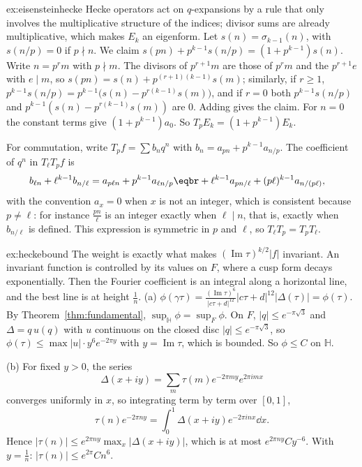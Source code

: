 \begin{solution}{ex:eisensteinhecke}
\idea Hecke operators act on $q$-expansions by a rule that only involves the multiplicative structure of the indices; divisor sums are already multiplicative, which makes $E_k$ an eigenform.
\writeup Let $s(n)=\sigma_{k-1}(n)$, with $s(n/p)=0$ if $p\nmid n$. We claim $s(pn)+p^{k-1}s(n/p)=(1+p^{k-1})s(n)$. Write $n=p^rm$ with $p\nmid m$. The divisors of $p^{r+1}m$ are those of $p^rm$ and the $p^{r+1}e$ with $e\mid m$, so
$s(pn)=s(n)+p^{(r+1)(k-1)}s(m)$; similarly, if $r\ge1$, $p^{k-1}s(n/p)=p^{k-1}\bigl(s(n)-p^{r(k-1)}s(m)\bigr)$, and if $r=0$ both $p^{k-1}s(n/p)$ and $p^{k-1}(s(n)-p^{r(k-1)}s(m))$ are $0$. Adding gives the claim. For $n=0$
the constant terms give $(1+p^{k-1})a_0$. So $T_pE_k=(1+p^{k-1})E_k$.

For commutation, write $T_pf=\sum b_nq^n$ with $b_n=a_{pn}+p^{k-1}a_{n/p}$. The coefficient of $q^n$ in $T_\ell T_pf$ is
\[
\begin{aligned}b_{\ell n}+\ell^{k-1}b_{n/\ell}&=a_{p\ell n}+p^{k-1}a_{\ell n/p}\eqbr+\ell^{k-1}a_{pn/\ell}+(p\ell)^{k-1}a_{n/(p\ell)},\end{aligned}
\]
with the convention $a_x=0$ when $x$ is not an integer, which is consistent because $p\ne\ell$: for instance $\frac{pn}\ell$ is an integer exactly when $\ell\mid n$, that is, exactly when $b_{n/\ell}$ is defined.
This expression is symmetric in $p$ and $\ell$, so $T_\ell T_p=T_pT_\ell$.
\end{solution}

\begin{solution}{ex:heckebound}
\idea The weight is exactly what makes $(\operatorname{Im}\tau)^{k/2}|f|$ invariant. An invariant function is controlled by its values on $F$, where a cusp form decays exponentially. Then the Fourier coefficient is an
integral along a horizontal line, and the best line is at height $\frac1n$.
\writeup (a) $\phi(\gamma\tau)=\frac{(\operatorname{Im}\tau)^6}{|c\tau+d|^{12}}|c\tau+d|^{12}|\Delta(\tau)|=\phi(\tau)$. By Theorem~\ref{thm:fundamental}, $\sup_{\mathbb H}\phi=\sup_F\phi$. On $F$, $|q|\le e^{-\pi\sqrt3}$ and $\Delta=q\,u(q)$ with
$u$ continuous on the closed disc $|q|\le e^{-\pi\sqrt3}$, so $\phi(\tau)\le\max|u|\cdot y^6e^{-2\pi y}$ with $y=\operatorname{Im}\tau$, which is bounded. So $\phi\le C$ on $\mathbb H$.

(b) For fixed $y>0$, the series
\[
\Delta(x+iy)=\sum_m\tau(m)e^{-2\pi my}e^{2\pi imx}
\]
converges uniformly in $x$, so integrating term by term over $[0,1]$,
\[
\tau(n)e^{-2\pi ny}=\int_0^1\Delta(x+iy)e^{-2\pi inx}\dd x.
\]
Hence $|\tau(n)|\le e^{2\pi ny}\max_x|\Delta(x+iy)|$, which is at most $e^{2\pi ny}Cy^{-6}$. With $y=\frac1n$: $|\tau(n)|\le e^{2\pi}Cn^6$.
\end{solution}

